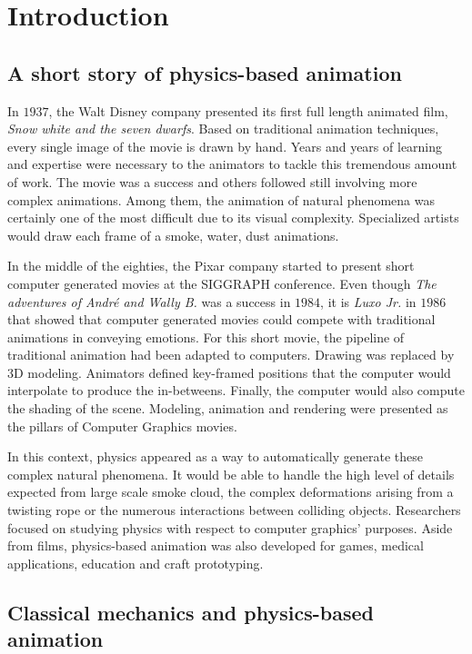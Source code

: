 \chapter{Introduction}
\label{chap:introduction}

\section{A short story of physics-based animation}

In $1937$, the Walt Disney company presented its first full length animated film, \emph{Snow white and the seven dwarfs}. Based on traditional animation techniques, every single image of the movie is drawn by hand. Years and years of learning and expertise were necessary to the animators to tackle this tremendous amount of work. The movie was a success and others followed still involving more complex animations. Among them, the animation of natural phenomena was certainly one of the most difficult due to its visual complexity. Specialized artists would draw each frame of a smoke, water, dust animations.

In the middle of the eighties, the Pixar company started to present short computer generated movies at the SIGGRAPH conference. Even though \emph{The adventures of André and Wally B.} was a success in $1984$, it is \emph{Luxo Jr.} in $1986$ that showed that computer generated movies could compete with traditional animations in conveying emotions. For this short movie, the pipeline of traditional animation had been adapted to computers. Drawing was replaced by 3D modeling. Animators defined key-framed positions that the computer would interpolate to produce the in-betweens. Finally, the computer would also compute the shading of the scene. Modeling, animation and rendering were presented as the pillars of Computer Graphics movies.

In this context, physics appeared as a way to automatically generate these complex natural phenomena. It would be able to handle the high level of details expected from large scale smoke cloud, the complex deformations arising from a twisting rope or the numerous interactions between colliding objects. Researchers focused on studying physics with respect to computer graphics' purposes. Aside from films, physics-based animation was also developed for games, medical applications, education and craft prototyping.

\section{Classical mechanics and physics-based animation}

